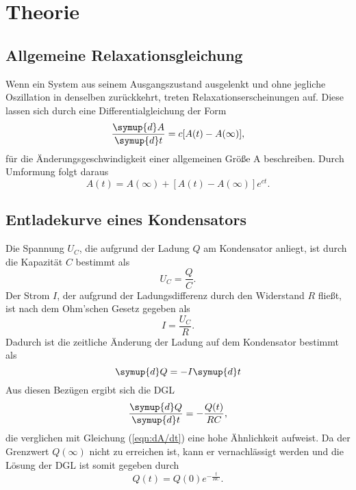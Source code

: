 \section{Theorie}
\label{sec:Theorie}

\subsection{Allgemeine Relaxationsgleichung}
Wenn ein System aus seinem Ausgangszustand ausgelenkt und ohne jegliche Oszillation in denselben zurückkehrt, treten Relaxationserscheinungen auf. Diese lassen sich durch
eine Differentialgleichung der Form
\begin{equation}
    \label{eqn:dA/dt}
    \frac{\symup{d}A}{\symup{d}t} = c[A(t)-A(\infty)],
\end{equation}
für die Änderungsgeschwindigkeit einer allgemeinen Größe A beschreiben.
Durch Umformung folgt daraus
\begin{equation}
    \label{eqn:AllgemeineRelaxationsgleichung}
    A(t)=A(\infty)+[A(t)-A(\infty)]e^{ct}.
\end{equation}


\subsection{Entladekurve eines Kondensators}
Die Spannung $U_C$, die aufgrund der Ladung $Q$ am Kondensator anliegt, ist durch die Kapazität $C$ bestimmt als
\begin{equation*}
    U_C=\frac{Q}{C}.
\end{equation*}
Der Strom $I$, der aufgrund der Ladungsdifferenz durch den Widerstand $R$ fließt, ist nach dem Ohm'schen Gesetz gegeben als
\begin{equation*}
    I=\frac{U_C}{R}.
\end{equation*}
Dadurch ist die zeitliche Änderung der Ladung auf dem Kondensator bestimmt als
\begin{equation*}
    \symup{d}Q=-I\symup{d}t
\end{equation*}
Aus diesen Bezügen ergibt sich die DGL
\begin{equation}
    \label{eqn:dQ/dt}
    \frac{\symup{d}Q}{\symup{d}t}=-\frac{Q(t)}{RC},
\end{equation}
die verglichen mit Gleichung (\ref{eqn:dA/dt}) eine hohe Ähnlichkeit aufweist. Da der Grenzwert $Q(\infty)$ nicht zu erreichen ist, kann er vernachlässigt werden und die Lösung
der DGL ist somit gegeben durch
\begin{equation}
    \label{eqn:Entladung}
    Q(t)=Q(0)e^{-\frac{t}{RC}}.
\end{equation}


